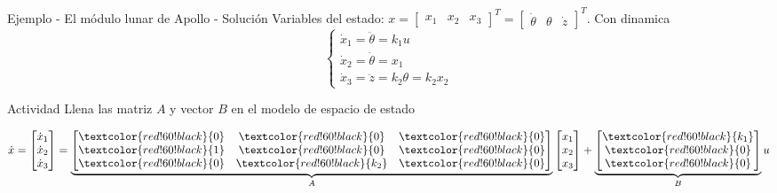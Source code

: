 \documentclass[presentation,aspectratio=1610]{beamer}
\begin{document}
\begin{frame}[label={sec:orgd079e52}]{Ejemplo - El módulo lunar de Apollo - Solución}
Variables del estado: \(x = \begin{bmatrix} x_1 & x_2 & x_3 \end{bmatrix}^T = \begin{bmatrix} \dot{\theta} & \theta & \dot{z} \end{bmatrix}^T\). Con dinamica
\[ \begin{cases} \dot{x}_1 =  \ddot{\theta} = k_1 u\\ \dot{x}_2 = \dot{\theta} = x_1\\ \dot{x}_3 = \ddot{z} = k_2\theta = k_2x_2 \end{cases} \]

\alert{Actividad} Llena las matriz \(A\) y vector \(B\) en el modelo de espacio de estado

\[ \dot{x} = \begin{bmatrix} \dot{x}_1\\\dot{x}_2\\\dot{x}_3\end{bmatrix} = \underbrace{\begin{bmatrix} \textcolor{red!60!black}{0} & \textcolor{red!60!black}{0} &\textcolor{red!60!black}{0} \\\textcolor{red!60!black}{1} & \textcolor{red!60!black}{0}& \textcolor{red!60!black}{0}\\ \textcolor{red!60!black}{0}& \textcolor{red!60!black}{k_2} &\textcolor{red!60!black}{0} \end{bmatrix}}_{A} \begin{bmatrix} x_1\\x_2\\x_3\end{bmatrix} + \underbrace{\begin{bmatrix} \textcolor{red!60!black}{k_1} \\ \textcolor{red!60!black}{0} \\\textcolor{red!60!black}{0}  \end{bmatrix}}_{B} u \]
\end{frame}
\end{document}
